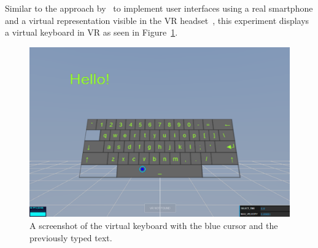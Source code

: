 Similar to the approach by~\citeauthor{Dias.2018} to implement user interfaces using a real smartphone and a virtual representation visible in the \ac{VR} headset~\cite[5]{Dias.2018}, this experiment displays a virtual keyboard in \ac{VR} as seen in Figure~\ref{fig:screenshot-exp-vk}.



\begin{figure}[htpb]
  \centering
  \includegraphics[width=12cm]{figures/screenshot_exp_vk.png}
  \caption[Screenshot: virtual keyboard experiment]{A screenshot of the virtual keyboard with the blue cursor and the previously typed text.}\label{fig:screenshot-exp-vk}
\end{figure}

